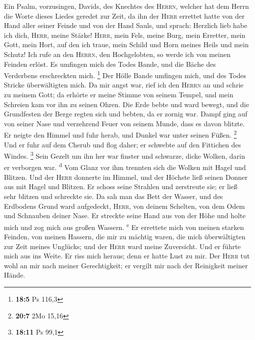  Ein Psalm, vorzusingen, Davids, des Knechtes des
\textsc{Herrn}, welcher hat dem Herrn die Worte dieses Liedes geredet
zur Zeit, da ihn der \textsc{Herr} errettet hatte von der Hand aller
seiner Feinde und von der Hand Sauls,  und sprach:
Herzlich lieb habe ich dich, \textsc{Herr}, meine Stärke! 
\textsc{Herr}, mein Fels, meine Burg, mein Erretter, mein Gott, mein
Hort, auf den ich traue, mein Schild und Horn meines Heils und mein
Schutz!  Ich rufe an den \textsc{Herrn}, den Hochgelobten,
so werde ich von meinen Feinden erlöst.  Es umfingen mich
des Todes Bande, und die Bäche des Verderbens erschreckten mich.
\footnote{\textbf{18:5} Ps 116,3}  Der Hölle Bande
umfingen mich, und des Todes Stricke überwältigten mich. 
Da mir angst war, rief ich den \textsc{Herrn} an und schrie zu meinem
Gott; da erhörte er meine Stimme von seinem Tempel, und mein Schreien
kam vor ihn zu seinen Ohren.  Die Erde bebte und ward
bewegt, und die Grundfesten der Berge regten sich und bebten, da er
zornig war.  Dampf ging auf von seiner Nase und verzehrend
Feuer von seinem Munde, dass es davon blitzte.  Er neigte
den Himmel und fuhr herab, und Dunkel war unter seinen Füßen.
\footnote{\textbf{20:7} 2Mo 15,16}  Und er fuhr auf dem
Cherub und flog daher; er schwebte auf den Fittichen des Windes.
\footnote{\textbf{18:11} Ps 99,1}  Sein Gezelt um ihn her
war finster und schwarze, dicke Wolken, darin er verborgen war.
\textsuperscript{d}  Vom Glanz vor ihm trennten sich die
Wolken mit Hagel und Blitzen.  Und der \textsc{Herr}
donnerte im Himmel, und der Höchste ließ seinen Donner aus mit Hagel und
Blitzen.  Er schoss seine Strahlen und zerstreute sie; er
ließ sehr blitzen und schreckte sie.  Da sah man das Bett
der Wasser, und des Erdbodens Grund ward aufgedeckt, \textsc{Herr}, von
deinem Schelten, von dem Odem und Schnauben deiner Nase. 
Er streckte seine Hand aus von der Höhe und holte mich und zog mich aus
großen Wassern. \textsuperscript{e}  Er errettete mich
von meinen starken Feinden, von meinen Hassern, die mir zu mächtig
waren,  die mich überwältigten zur Zeit meines Unglücks;
und der \textsc{Herr} ward meine Zuversicht.  Und er
führte mich aus ins Weite. Er riss mich heraus; denn er hatte Lust zu
mir.  Der \textsc{Herr} tut wohl an mir nach meiner
Gerechtigkeit; er vergilt mir nach der Reinigkeit meiner Hände.
